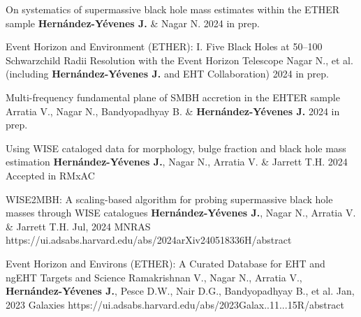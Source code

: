 
\begin{cvpublications}{}

	 {On systematics of supermassive black hole mass estimates within the ETHER sample}
	 {\textbf{Hernández-Yévenes J.} \& Nagar N.}
	 {2024}
     {in prep.}
     {}

	 {Event Horizon and Environment (ETHER): I. Five Black Holes at 50–100 Schwarzchild Radii Resolution with the Event Horizon Telescope}
	 {Nagar N., et al. (including \textbf{Hernández-Yévenes J.} and EHT Collaboration)}
	 {2024}
     {in prep.}
     {}

	 {Multi-frequency fundamental plane of SMBH accretion in the EHTER sample}
	 {Arratia V., Nagar N., Bandyopadhyay B. \& \textbf{Hernández-Yévenes J.}}
	 {2024}
     {in prep.}
     {}
     
	 {Using WISE cataloged data for morphology, bulge fraction and black hole mass estimation}
	 {\textbf{Hernández-Yévenes J.}, Nagar N., Arratia V. \& Jarrett T.H.}
	 {2024}
     {Accepted in RMxAC}
     {}
     
	 {WISE2MBH: A scaling-based algorithm for probing supermassive black hole masses through WISE catalogues}
	 {\textbf{Hernández-Yévenes J.}, Nagar N., Arratia V. \& Jarrett T.H.}
	 {Jul, 2024}
     {MNRAS}
     {https://ui.adsabs.harvard.edu/abs/2024arXiv240518336H/abstract}

	{Event Horizon and Environs (ETHER): A Curated Database for EHT and ngEHT Targets and Science}
	{Ramakrishnan V., Nagar N., Arratia V., \textbf{Hernández-Yévenes J.}, Pesce D.W., Nair D.G., Bandyopadhyay B., et al.}
    {Jan, 2023}
	{Galaxies}
    {https://ui.adsabs.harvard.edu/abs/2023Galax..11...15R/abstract}

\end{cvpublications}
